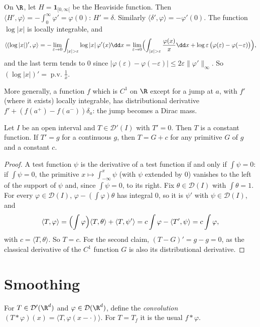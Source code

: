 \begin{example}\label{ex:derivatives}
On $\R$, let $H=\mathbf 1_{[0,\infty[}$ be the Heaviside function. Then $\langle H',\varphi\rangle=-\int_0^\infty\varphi'=\varphi(0)$: $H'=\delta$. Similarly $\langle\delta',\varphi\rangle=-\varphi'(0)$. The function $\log|x|$ is locally
integrable, and
\[\langle(\log|x|)',\varphi\rangle=-\lim_{\varepsilon\to0}\int_{|x|>\varepsilon}\log|x|\,\varphi'(x)\dd x=\lim_{\varepsilon\to0}\Bigl(\int_{|x|>\varepsilon}\frac{\varphi(x)}x\dd x+\log\varepsilon\,\bigl(\varphi(\varepsilon)-\varphi(-\varepsilon)\bigr)\Bigr),\]
and the last term tends to $0$ since $|\varphi(\varepsilon)-\varphi(-\varepsilon)|\le2\varepsilon\|\varphi'\|_\infty$. So $(\log|x|)'=\operatorname{p.v.}\frac1x$.
\end{example}

More generally, a function $f$ which is $C^1$ on $\R$ except for a jump at $a$, with $f'$ (where it exists) locally integrable, has distributional derivative $f'+(f(a^+)-f(a^-))\delta_a$: the jump becomes a Dirac mass.

\begin{theorem}\label{thm:zeroderiv}
Let $I$ be an open interval and $T\in\mathcal D'(I)$ with $T'=0$. Then $T$ is a constant function. If $T'=g$ for a continuous $g$, then $T=G+c$ for any primitive $G$ of $g$ and a constant $c$.
\end{theorem}
\begin{proof}
A test function $\psi$ is the derivative of a test function if and only if $\int\psi=0$: if $\int\psi=0$, the primitive $x\mapsto\int_{-\infty}^x\psi$ (with $\psi$ extended by $0$) vanishes to the left of the support of $\psi$ and, since
$\int\psi=0$, to its right. Fix $\theta\in\mathcal D(I)$ with $\int\theta=1$. For every $\varphi\in\mathcal D(I)$, $\varphi-(\int\varphi)\theta$ has integral $0$, so it is $\psi'$ with $\psi\in\mathcal D(I)$, and
\[\langle T,\varphi\rangle=\Bigl(\int\varphi\Bigr)\langle T,\theta\rangle+\langle T,\psi'\rangle=c\int\varphi-\langle T',\psi\rangle=c\int\varphi,\]
with $c=\langle T,\theta\rangle$. So $T=c$. For the second claim, $(T-G)'=g-g=0$, as the classical derivative of the $C^1$ function $G$ is also its distributional derivative.
\end{proof}

\section{Smoothing}

For $T\in\mathcal D'(\R^d)$ and $\varphi\in\mathcal D(\R^d)$, define the \emph{convolution} $(T*\varphi)(x)=\langle T,\varphi(x-\cdot)\rangle$. For $T=T_f$ it is the usual $f*\varphi$.


